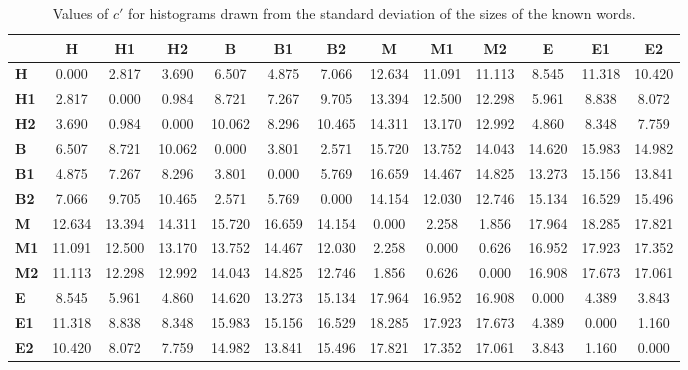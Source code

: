 \begin{table*}[h!]
\begin{center}
\begin{tabular}{| l || c | c | c || c | c | c || c | c | c || c | c | c |}\hline
 & {\bf H} & {\bf H1} & {\bf H2} & {\bf B} & {\bf B1} & {\bf B2} & {\bf M} & {\bf M1} & {\bf M2} & {\bf E} & {\bf E1} & {\bf E2} \\\hline\hline
{\bf H} & 0.000 & 2.817 & 3.690 & 6.507 & 4.875 & 7.066 & 12.634 & 11.091 & 11.113 & 8.545 & 11.318 & 10.420 \\\hline
{\bf H1} & 2.817 & 0.000 & 0.984 & 8.721 & 7.267 & 9.705 & 13.394 & 12.500 & 12.298 & 5.961 & 8.838 & 8.072 \\\hline
{\bf H2} & 3.690 & 0.984 & 0.000 & 10.062 & 8.296 & 10.465 & 14.311 & 13.170 & 12.992 & 4.860 & 8.348 & 7.759 \\\hline\hline
{\bf B} & 6.507 & 8.721 & 10.062 & 0.000 & 3.801 & 2.571 & 15.720 & 13.752 & 14.043 & 14.620 & 15.983 & 14.982 \\\hline
{\bf B1} & 4.875 & 7.267 & 8.296 & 3.801 & 0.000 & 5.769 & 16.659 & 14.467 & 14.825 & 13.273 & 15.156 & 13.841 \\\hline
{\bf B2} & 7.066 & 9.705 & 10.465 & 2.571 & 5.769 & 0.000 & 14.154 & 12.030 & 12.746 & 15.134 & 16.529 & 15.496 \\\hline\hline
{\bf M} & 12.634 & 13.394 & 14.311 & 15.720 & 16.659 & 14.154 & 0.000 & 2.258 & 1.856 & 17.964 & 18.285 & 17.821 \\\hline
{\bf M1} & 11.091 & 12.500 & 13.170 & 13.752 & 14.467 & 12.030 & 2.258 & 0.000 & 0.626 & 16.952 & 17.923 & 17.352 \\\hline
{\bf M2} & 11.113 & 12.298 & 12.992 & 14.043 & 14.825 & 12.746 & 1.856 & 0.626 & 0.000 & 16.908 & 17.673 & 17.061 \\\hline\hline
{\bf E} & 8.545 & 5.961 & 4.860 & 14.620 & 13.273 & 15.134 & 17.964 & 16.952 & 16.908 & 0.000 & 4.389 & 3.843 \\\hline
{\bf E1} & 11.318 & 8.838 & 8.348 & 15.983 & 15.156 & 16.529 & 18.285 & 17.923 & 17.673 & 4.389 & 0.000 & 1.160 \\\hline
{\bf E2} & 10.420 & 8.072 & 7.759 & 14.982 & 13.841 & 15.496 & 17.821 & 17.352 & 17.061 & 3.843 & 1.160 & 0.000 \\\hline
\end{tabular}
\caption{Values of $c'$ for histograms drawn from the standard deviation of the sizes of the known words.}
\end{center}
\end{table*}